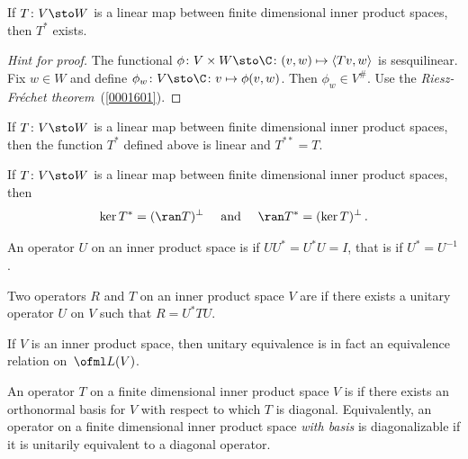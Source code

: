\begin{prop}\label{00016021} If $T\colon V \sto W$ is a linear map between finite
dimensional inner product spaces, then $T^*$ exists.
\end{prop}

\begin{proof}[\emph{Hint for proof}] The functional $\phi\colon V \times W \sto \C \colon
(v,w) \mapsto \langle Tv,w \rangle$ is sesquilinear. Fix $w \in W$ and define $\phi_w
\colon V \sto \C \colon v \mapsto \phi(v,w)$. Then $\phi_w \in V^{\#}$. Use the
\emph{Riesz-Fr\'echet theorem}~(\ref{0001601}).  \ns
\end{proof}

\begin{prop} If $T\colon V \sto W$ is a linear map between finite dimensional inner product
spaces, then the function $T^*$ defined above is linear and $T^{**} = T$.
\end{prop}

\begin{thm}\label{00016025} If
$T\colon V \sto W$ is a linear map between finite dimensional inner product spaces, then
   \[ \ker T^* = (\ran T)^\perp \quad \text{ and } \quad \ran T^* = (\ker T)^\perp\,. \]
\end{thm}

\begin{defn}\label{000161} An operator $U$ on an inner product space is
 if $UU^* = U^*U = I$, that is if $U^* = U^{-1}$.
\end{defn}

\begin{defn}\label{0001612} Two operators $R$ and $T$ on an inner product space $V$ are
 if there exists a unitary operator $U$ on $V$ such that $R =
U^*TU$.
\end{defn}

\begin{prop} If $V$ is an inner product space, then unitary equivalence is in fact an
equivalence relation on~$\ofml L(V)$.
\end{prop}

\begin{defn} An operator $T$ on a finite dimensional inner product space $V$ is
 if there exists an orthonormal basis for $V$ with respect
to which $T$ is diagonal. Equivalently, an operator on a finite dimensional inner product
space \emph{with basis} is diagonalizable if it is unitarily equivalent to a diagonal
operator.
\end{defn}

